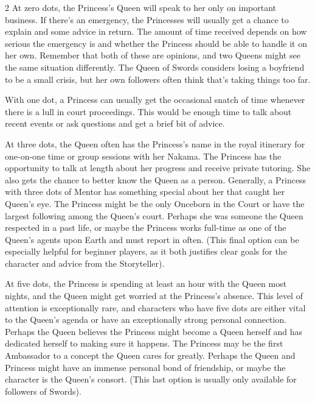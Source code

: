 \begin{multicols}{2}
At zero dots, the Princess's Queen will speak to her only on important business. If there's an emergency, the Princesses will usually get a chance to explain and some advice in return. The amount of time received depends on how serious the emergency is and whether the Princess should be able to handle it on her own. Remember that both of these are opinions, and two Queens might see the same situation differently. The Queen of Swords considers losing a boyfriend to be a small crisis, but her own followers often think that's taking things too far.

With one dot, a Princess can usually get the occasional snatch of time whenever there is a lull in court proceedings. This would be enough time to talk about recent events or ask questions and get a brief bit of advice.

At three dots, the Queen often has the Princess's name in the royal itinerary for one-on-one time or group sessions with her Nakama. The Princess has the opportunity to talk at length about her progress and receive private tutoring. She also gets the chance to better know the Queen as a person. Generally, a Princess with three dots of Mentor has something special about her that caught her Queen's eye. The Princess might be the only Onceborn in the Court or have the largest following among the Queen's court. Perhaps she was someone the Queen respected in a past life, or maybe the Princess works full-time as one of the Queen's agents upon Earth and must report in often. (This final option can be especially helpful for beginner players, as it both justifies clear goals for the character and advice from the Storyteller).

At five dots, the Princess is spending at least an hour with the Queen most nights, and the Queen might get worried at the Princess's absence. This level of attention is exceptionally rare, and characters who have five dots are either vital to the Queen's agenda or have an exceptionally strong personal connection. Perhaps the Queen believes the Princess might become a Queen herself and has dedicated herself to making sure it happens. The Princess may be the first Ambassador to a concept the Queen cares for greatly. Perhaps the Queen and Princess might have an immense personal bond of friendship, or maybe the character is the Queen's consort. (This last option is usually only available for followers of Swords).


\end{multicols}
